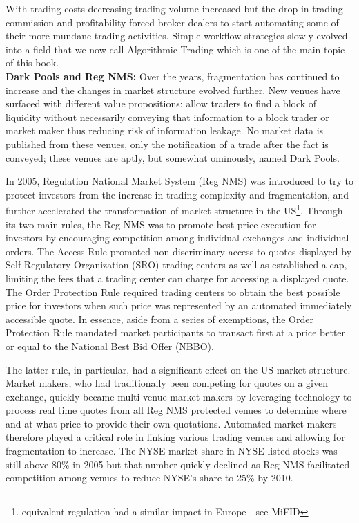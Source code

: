 With trading costs decreasing trading volume increased but the drop in trading commission and profitability forced broker dealers to start automating some of their more mundane trading activities. Simple workflow strategies slowly evolved into a field that we now call Algorithmic Trading which is one of the main topic of this book. \\


\noindent\textbf{Dark Pools and Reg NMS:} Over the years, fragmentation has continued to increase and the changes in market structure evolved further. New venues have surfaced with different value propositions: allow traders to find a block of liquidity without necessarily conveying that information to a block trader or market maker thus reducing risk of information leakage. No market data is published from these venues, only the notification of a trade after the fact is conveyed; these venues are aptly, but somewhat ominously, named Dark Pools.


In 2005, Regulation National Market System (Reg NMS) was introduced to try to protect investors from the increase in trading complexity and fragmentation, and further accelerated the transformation of market structure in the US\footnote{equivalent regulation had a similar impact in Europe - see MiFID}. Through its two main rules, the Reg NMS was to promote best price execution for investors by encouraging competition among individual exchanges and individual orders. The Access Rule promoted non-discriminary access to quotes displayed by Self-Regulatory Organization (SRO) trading centers as well as established a cap, limiting the fees that a trading center can charge for accessing a displayed quote. The Order Protection Rule required trading centers to obtain the best possible price for investors when such price was represented by an automated immediately accessible quote. In essence, aside from a series of exemptions, the Order Protection Rule mandated market participants to transact first at a price better or equal to the National Best Bid Offer (NBBO). 

The latter rule, in particular, had a significant effect on the US market structure. Market makers, who had traditionally been competing for quotes on a given exchange, quickly became multi-venue market makers by leveraging technology to process real time  quotes from all Reg NMS protected venues to determine where and at what price to provide their own quotations. Automated market makers therefore played a critical role in linking various trading venues and allowing for fragmentation to increase. The NYSE market share in NYSE-listed stocks was still above 80\% in 2005 but that number quickly declined as Reg NMS facilitated competition among venues to reduce NYSE's share to 25\% by 2010. 

